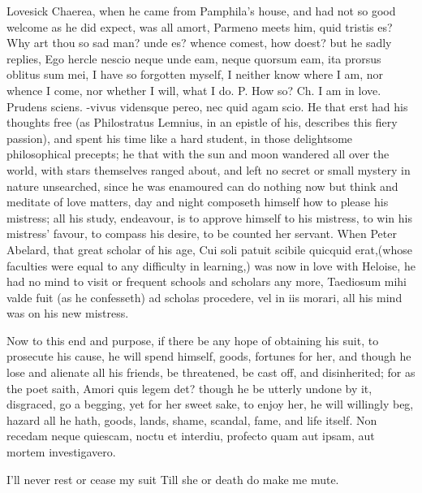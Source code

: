 {Lovesick Chaerea, when he came from Pamphila's house, and had not
so good welcome as he did expect, was all amort, Parmeno meets him,
quid tristis es? Why art thou so sad man? unde es? whence comest, how
doest? but he sadly replies, Ego hercle nescio neque unde eam, neque
quorsum eam, ita prorsus oblitus sum mei, I have so forgotten myself, I
neither know where I am, nor whence I come, nor whether I will, what I
do. P. How so? Ch. I am in love. Prudens sciens. -vivus
vidensque pereo, nec quid agam scio. He that erst had his
thoughts free (as Philostratus Lemnius, in an epistle of his, describes
this fiery passion), and spent his time like a hard student, in those
delightsome philosophical precepts; he that with the sun and moon
wandered all over the world, with stars themselves ranged about, and
left no secret or small mystery in nature unsearched, since he was
enamoured can do nothing now but think and meditate of love matters,
day and night composeth himself how to please his mistress; all his
study, endeavour, is to approve himself to his mistress, to win his
mistress' favour, to compass his desire, to be counted her servant.
When Peter Abelard, that great scholar of his age, Cui soli patuit
scibile quicquid erat,(whose faculties were equal to any
difficulty in learning,) was now in love with Heloise, he had no mind
to visit or frequent schools and scholars any more, Taediosum mihi
valde fuit (as he confesseth) ad scholas procedere, vel in iis
morari, all his mind was on his new mistress.

Now to this end and purpose, if there be any hope of obtaining his
suit, to prosecute his cause, he will spend himself, goods, fortunes
for her, and though he lose and alienate all his friends, be
threatened, be cast off, and disinherited; for as the poet saith, Amori
quis legem det? though he be utterly undone by it, disgraced, go
a begging, yet for her sweet sake, to enjoy her, he will willingly beg,
hazard all he hath, goods, lands, shame, scandal, fame, and life
itself.
Non recedam neque quiescam, noctu et interdiu,
profecto quam aut ipsam, aut mortem investigavero.

I'll never rest or cease my suit
Till she or death do make me mute.

}
